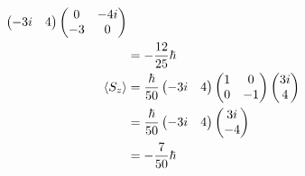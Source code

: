 \documentclass{article}
\begin{document}
\begin{enumerate}
\begin{align*}
\begin{pmatrix}
                                                                  -3 i & 4
                                                                \end{pmatrix} \begin{pmatrix}
                                                                                0  & -4 i \\
                                                                                -3 & 0
                                                                              \end{pmatrix}               \\
                                           & = -\frac{12}{25} \hbar                                        \\
          \braket{S_z}                     & = \frac{\hbar}{50} \begin{pmatrix}
                                                                  -3 i & 4
                                                                \end{pmatrix} \begin{pmatrix}
                                                                                1 & 0  \\
                                                                                0 & -1
                                                                              \end{pmatrix} \begin{pmatrix}
                                                                                              3 i \\
                                                                                              4
                                                                                            \end{pmatrix} \\
                                           & = \frac{\hbar}{50} \begin{pmatrix}
                                                                  -3 i & 4
                                                                \end{pmatrix} \begin{pmatrix}
                                                                                3 i \\
                                                                                -4
                                                                              \end{pmatrix}               \\
                                           & = -\frac{7}{50} \hbar
        \end{align*}


\end{enumerate}
\end{document}
